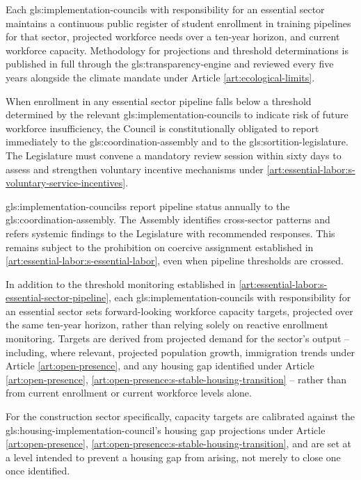Each \gls{gls:implementation-councils} with responsibility for an essential sector maintains a continuous public register of student enrollment in training pipelines for that sector, projected workforce needs over a ten-year horizon, and current workforce capacity. Methodology for projections and threshold determinations is published in full through the \gls{gls:transparency-engine} and reviewed every five years alongside the climate mandate under Article \ref{art:ecological-limits}.

When enrollment in any essential sector pipeline falls below a threshold determined by the relevant \gls{gls:implementation-councils} to indicate risk of future workforce insufficiency, the Council is constitutionally obligated to report immediately to the \gls{gls:coordination-assembly} and to the \gls{gls:sortition-legislature}. The Legislature must convene a mandatory review session within sixty days to assess and strengthen voluntary incentive mechanisms under \ref{art:essential-labor:s-voluntary-service-incentives}.

\gls{gls:implementation-councils}s report pipeline status annually to the \gls{gls:coordination-assembly}. The Assembly identifies cross-sector patterns and refers systemic findings to the Legislature with recommended responses. This remains subject to the prohibition on coercive assignment established in \ref{art:essential-labor:s-essential-labor}, even when pipeline thresholds are crossed.

In addition to the threshold monitoring established in \ref{art:essential-labor:s-essential-sector-pipeline}, each \gls{gls:implementation-councils} with responsibility for an essential sector sets forward-looking workforce capacity targets, projected over the same ten-year horizon, rather than relying solely on reactive enrollment monitoring. Targets are derived from projected demand for the sector's output -- including, where relevant, projected population growth, immigration trends under Article \ref{art:open-presence}, and any housing gap identified under Article \ref{art:open-presence}, \ref{art:open-presence:s-stable-housing-transition} -- rather than from current enrollment or current workforce levels alone.

For the construction sector specifically, capacity targets are calibrated against the \gls{gls:housing-implementation-council}'s housing gap projections under Article \ref{art:open-presence}, \ref{art:open-presence:s-stable-housing-transition}, and are set at a level intended to prevent a housing gap from arising, not merely to close one once identified.

